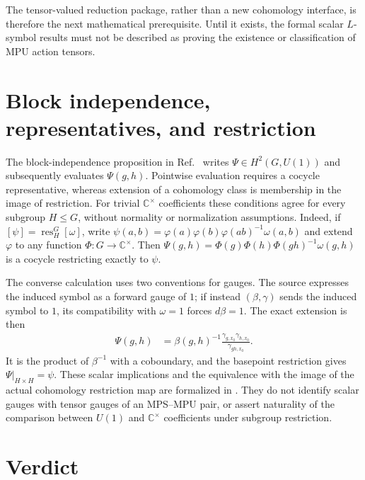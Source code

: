 \documentclass{article}
\begin{document}
The tensor-valued reduction package, rather than a new cohomology interface,
is therefore the next mathematical prerequisite.  Until it exists, the
formal scalar $L$-symbol results must not be described as proving the
existence or classification of MPU action tensors.

\section{Block independence, representatives, and restriction}

The block-independence proposition in
Ref.~\cite[lines~7042--7064]{FrancoRubio2025MPUGauging} writes
$\Psi\in H^2(G,U(1))$ and subsequently evaluates $\Psi(g,h)$.
Pointwise evaluation requires a cocycle representative, whereas extension
of a cohomology class is membership in the image of restriction.
For trivial $\mathbb C^\times$ coefficients these conditions agree for
every subgroup $H\leq G$, without normality or normalization assumptions.
Indeed, if $[\psi]=\operatorname{res}^G_H[\omega]$, write
$\psi(a,b)=\varphi(a)\varphi(b)\varphi(ab)^{-1}\omega(a,b)$ and extend
$\varphi$ to any function $\Phi:G\to\mathbb C^\times$.
Then $\Psi(g,h)=\Phi(g)\Phi(h)\Phi(gh)^{-1}\omega(g,h)$ is a cocycle
restricting exactly to $\psi$.

The converse calculation uses two conventions for gauges. The source
expresses the induced symbol as a forward gauge of $1$; if instead
$(\beta,\gamma)$ sends the induced symbol to $1$, its compatibility with
$\omega=1$ forces $d\beta=1$. The exact extension is then
\begin{align}
    \Psi(g,h)
      &=\beta(g,h)^{-1}
        \frac{\gamma_{g,x_0}\gamma_{h,x_0}}{\gamma_{gh,x_0}}.
    \label{eq:fbc25_action_audit_bi_extension}
\end{align}
It is the product of $\beta^{-1}$ with a coboundary, and the basepoint
restriction gives $\Psi|_{H\times H}=\psi$.
These scalar implications and the equivalence with the image of the actual
cohomology restriction map are formalized in
.
They do not identify scalar gauges with tensor gauges of an MPS--MPU pair,
or assert naturality of the comparison between $U(1)$ and
$\mathbb C^\times$ coefficients under subgroup restriction.

\section{Verdict}
\end{document}
